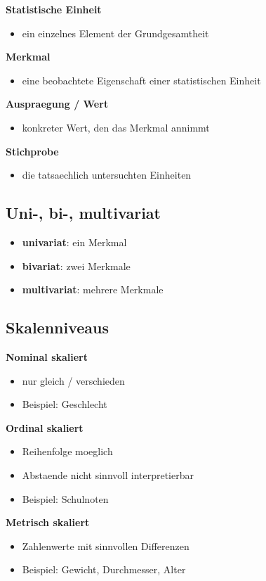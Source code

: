 \documentclass[a4paper,11pt]{article}
\begin{document}
\textbf{Statistische Einheit}
\begin{itemize}
  \item ein einzelnes Element der Grundgesamtheit
\end{itemize}

\textbf{Merkmal}
\begin{itemize}
  \item eine beobachtete Eigenschaft einer statistischen Einheit
\end{itemize}

\textbf{Auspraegung / Wert}
\begin{itemize}
  \item konkreter Wert, den das Merkmal annimmt
\end{itemize}

\textbf{Stichprobe}
\begin{itemize}
  \item die tatsaechlich untersuchten Einheiten
\end{itemize}

\subsection{Uni-, bi-, multivariat}
\begin{itemize}
  \item \textbf{univariat}: ein Merkmal
  \item \textbf{bivariat}: zwei Merkmale
  \item \textbf{multivariat}: mehrere Merkmale
\end{itemize}

\subsection{Skalenniveaus}
\textbf{Nominal skaliert}
\begin{itemize}
  \item nur gleich / verschieden
  \item Beispiel: Geschlecht
\end{itemize}

\textbf{Ordinal skaliert}
\begin{itemize}
  \item Reihenfolge moeglich
  \item Abstaende nicht sinnvoll interpretierbar
  \item Beispiel: Schulnoten
\end{itemize}

\textbf{Metrisch skaliert}
\begin{itemize}
  \item Zahlenwerte mit sinnvollen Differenzen
  \item Beispiel: Gewicht, Durchmesser, Alter
\end{itemize}
\end{document}
